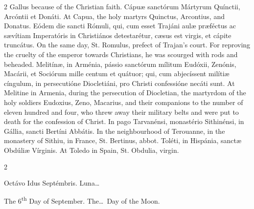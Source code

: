 \begin{paracol}{2}
 Gallus because of the Christian faith.
\switchcolumn*
{}
Cápuæ sanctórum 
 Mártyrum Quínctii, Arcóntii et Donáti.
\switchcolumn
{}
At Capua, the holy martyrs Quinctus, 
 Arcontius, and Donatus.
\switchcolumn*
{}
Eódem die sancti Rómuli, 
 qui, cum esset Trajáni aulæ præféctus ac sævítiam Imperatóris in Christiános 
 detestarétur, cæsus est virgis, et cápite truncátus.
\switchcolumn
{}
On the same day, St. Romulus, 
 prefect of Trajan's court. For reproving the cruelty of the emperor 
 towards Christians, he was scourged with rods and beheaded.
\switchcolumn*
{}
Melitínæ, in Arménia, pássio sanctórum mílitum Eudóxii, Zenónis, Macárii, et Sociórum mille centum 
 et quátuor; qui, cum abjecíssent milítiæ cíngulum, in persecutióne 
 Diocletiáni, pro Christi confessióne necáti sunt.
\switchcolumn
{}
At Melitine in Armenia, during the 
 persecution of Diocletian, the martyrdom of the holy soldiers Eudoxius, 
 Zeno, Macarius, and their companions to the number of eleven hundred and 
 four, who threw away their military belts and were put to death for the 
 confession of Christ.
\switchcolumn*
{}
In pago Tarvanénsi, 
 monastério Sithinénsi, in Gállia, sancti Bertíni Abbátis.
\switchcolumn
{}
In the neighbourhood of Terouanne, 
 in the monastery of Sithiu, in France, St. Bertinus, abbot.
\switchcolumn*
{}
Toléti, in Hispánia, 
 sanctæ Obdúliæ Vírginis.
\switchcolumn
{}
At Toledo in Spain, St. Obdulia, 
 virgin.
\switchcolumn*
{}
\end{paracol}


\begin{paracol}{2}
\begin{center}{\color{gregoriocolor} Octávo Idus Septémbris. 
 Luna\dots\ }\end{center}
\switchcolumn
{}
\begin{center}{\color{gregoriocolor} The   6\textsuperscript{th} Day of 
 September. The\dots\ Day of the Moon.}\end{center}
\end{paracol}

